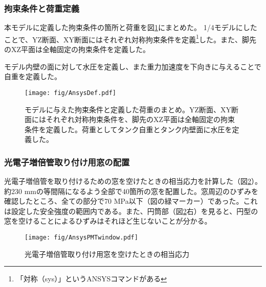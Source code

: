 \documentclass[11pt]{jreport}
\newcommand{\figref}[1]{図\ref{#1}}
\begin{document}
\subsubsection{拘束条件と荷重定義}


本モデルに定義した拘束条件の箇所と荷重を\figref{AnsysDef}にまとめた。
1/4モデルにしたことで、YZ断面、XY断面にはそれぞれ対称拘束条件を定義\footnote{「対称（sys）」というANSYSコマンドがある}した。また、脚先のXZ平面は全軸固定の拘束条件を定義した。

モデル内壁の面に対して水圧を定義し、また重力加速度を下向きに与えることで自重を定義した。

\begin{figure}[h]
\centering
\texttt{[image: fig/AnsysDef.pdf]}
\caption[拘束条件と荷重定義]{モデルに与えた拘束条件と定義した荷重のまとめ。YZ断面、XY断面にはそれぞれ対称拘束条件を、脚先のXZ平面は全軸固定の拘束条件を定義した。荷重としてタンク自重とタンク内壁面に水圧を定義した。}
\label{AnsysDef}
\end{figure}




\subsubsection{光電子増倍管取り付け用窓の配置}
光電子増倍管を取り付けるための窓を空けたときの相当応力を計算した（\figref{AnsysPMTwindow}）。約230 mmの等間隔になるよう全部で40箇所の窓を配置した。窓周辺のひずみを確認したところ、全ての部分で70 MPa以下（図の緑マーカー）であった。これは設定した安全強度の範囲内である。また、円筒部（\figref{AnsysPMTwindow}右）を見ると、円型の窓を空けることによるひずみはそれほど生じないことが分かる。

\begin{figure}[htbp]
\centering
\texttt{[image: fig/AnsysPMTwindow.pdf]}
\caption[光電子増倍管取り付け用窓を空けたときの相当応力]{光電子増倍管取り付け用窓を空けたときの相当応力}
\label{AnsysPMTwindow}
\end{figure}
\end{document}
